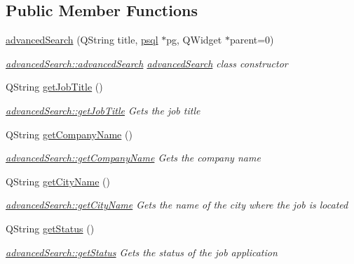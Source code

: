 \subsection*{Public Member Functions}
\begin{DoxyCompactItemize}
\item 
\mbox{\hyperlink{classadvanced_search_ae9e0253869871c6af23d804fdc78d184}{advanced\+Search}} (Q\+String title, \mbox{\hyperlink{classpsql}{psql}} $\ast$pg, Q\+Widget $\ast$parent=0)
\begin{DoxyCompactList}\small\item\em \mbox{\hyperlink{classadvanced_search_ae9e0253869871c6af23d804fdc78d184}{advanced\+Search\+::advanced\+Search}} \mbox{\hyperlink{classadvanced_search}{advanced\+Search}} class constructor \end{DoxyCompactList}\item 
Q\+String \mbox{\hyperlink{classadvanced_search_a7bcbaf1e2663396daacf9b033c34238a}{get\+Job\+Title}} ()
\begin{DoxyCompactList}\small\item\em \mbox{\hyperlink{classadvanced_search_a7bcbaf1e2663396daacf9b033c34238a}{advanced\+Search\+::get\+Job\+Title}} Gets the job title \end{DoxyCompactList}\item 
Q\+String \mbox{\hyperlink{classadvanced_search_a5e9e9e24e83f36f9ed32bd60cecbb7de}{get\+Company\+Name}} ()
\begin{DoxyCompactList}\small\item\em \mbox{\hyperlink{classadvanced_search_a5e9e9e24e83f36f9ed32bd60cecbb7de}{advanced\+Search\+::get\+Company\+Name}} Gets the company name \end{DoxyCompactList}\item 
Q\+String \mbox{\hyperlink{classadvanced_search_ae061d04a2d39bcb3dc363fc56752377b}{get\+City\+Name}} ()
\begin{DoxyCompactList}\small\item\em \mbox{\hyperlink{classadvanced_search_ae061d04a2d39bcb3dc363fc56752377b}{advanced\+Search\+::get\+City\+Name}} Gets the name of the city where the job is located \end{DoxyCompactList}\item 
Q\+String \mbox{\hyperlink{classadvanced_search_afc318495c6475695844bd0f22c6c1e3c}{get\+Status}} ()
\begin{DoxyCompactList}\small\item\em \mbox{\hyperlink{classadvanced_search_afc318495c6475695844bd0f22c6c1e3c}{advanced\+Search\+::get\+Status}} Gets the status of the job application \end{DoxyCompactList}\item 

\end{DoxyCompactItemize}
